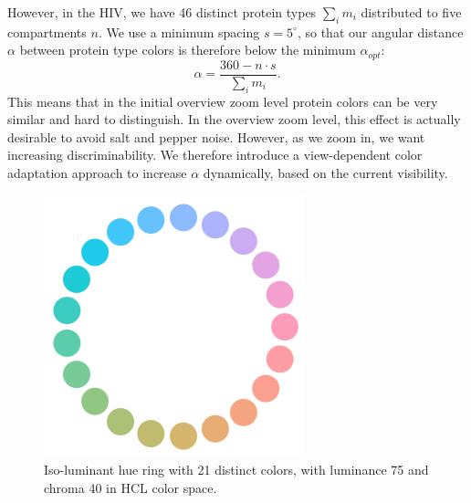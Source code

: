 \documentclass{egpubl}
\begin{document}
	However, in the HIV, we have 46 distinct protein types $\sum_{i} m_i$ distributed to five compartments $n$. 
	We use a minimum spacing $s=5^{\circ}$, so that our angular distance  $\alpha$ between protein type colors is therefore below the minimum $\alpha_{opt}$: 
	\begin{equation}%
	\alpha= \frac{360  - n \cdot s}{\sum_{i} m_i}. %
	\label{eq:wedge}%
	\end{equation}%
	This means that in the initial overview zoom level protein colors can be very similar and hard to distinguish. 
	In the overview zoom level, this effect is actually desirable to avoid salt and pepper noise. 
	However, as we zoom in, we want increasing discriminability. 
	We therefore introduce a view-dependent color adaptation approach to increase $\alpha$ dynamically, based on the current visibility.  %
	\begin{figure}[t]
		\centering
		\includegraphics[width=0.3\linewidth]{Figures/hueWheel.png}
		\caption{Iso-luminant hue ring with 21 distinct colors, with luminance 75 and chroma 40 in HCL color space.}
		\label{fig:hueWheel}
	\end{figure}
	
\end{document}

